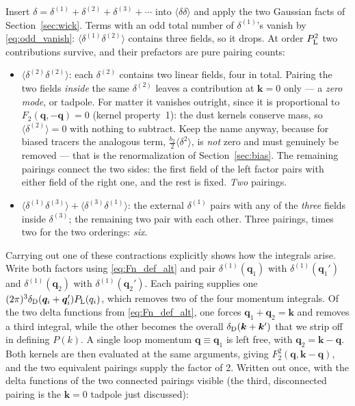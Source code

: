 \documentclass[a4paper,11pt]{article}
\newcommand{\vq}{\bm{q}}
\newcommand{\vk}{\bm{k}}
\def\Plin{P_{\rm L}}
\def\dirac{\delta_{\rm D}}
\numberwithin{equation}{section}
\begin{document}
Insert $\delta = \delta^{(1)} + \delta^{(2)} + \delta^{(3)} + \cdots$ into $\langle\delta\delta\rangle$ and apply the two Gaussian facts of Section~\ref{sec:wick}. Terms with an odd total number of $\delta^{(1)}$'s vanish by \eqref{eq:odd_vanish}: $\langle\delta^{(1)}\delta^{(2)}\rangle$ contains three fields, so it drops. At order $\Plin^2$ two contributions survive, and their prefactors are pure pairing counts:
\begin{itemize}[itemsep=2pt,topsep=2pt]
\item $\langle\delta^{(2)}\delta^{(2)}\rangle$: each $\delta^{(2)}$ contains two linear fields, four in total. Pairing the two fields \emph{inside} the same $\delta^{(2)}$ leaves a contribution at $\vk=0$ only --- a \emph{zero mode}, or tadpole. For matter it vanishes outright, since it is proportional to $F_2(\vq,-\vq) = 0$ (kernel property~1): the dust kernels conserve mass, so $\langle\delta^{(2)}\rangle = 0$ with nothing to subtract. Keep the name anyway, because for biased tracers the analogous term, $\tfrac{b_2}{2}\langle\delta^2\rangle$, is \emph{not} zero and must genuinely be removed --- that is the renormalization of Section~\ref{sec:bias}. The remaining pairings connect the two sides: the first field of the left factor pairs with either field of the right one, and the rest is fixed. \emph{Two} pairings.
\item $\langle\delta^{(1)}\delta^{(3)}\rangle + \langle\delta^{(3)}\delta^{(1)}\rangle$: the external $\delta^{(1)}$ pairs with any of the \emph{three} fields inside $\delta^{(3)}$; the remaining two pair with each other. Three pairings, times two for the two orderings: \emph{six}.
\end{itemize}
Carrying out one of these contractions explicitly shows how the integrals arise. Write both factors using \eqref{eq:Fn_def_alt} and pair $\delta^{(1)}(\vq_1)$ with $\delta^{(1)}(\vq_1')$ and $\delta^{(1)}(\vq_2)$ with $\delta^{(1)}(\vq_2')$. Each pairing supplies one $(2\pi)^3\dirac(\vq_i+\vq_i')\Plin(q_i)$, which removes two of the four momentum integrals. Of the two delta functions from \eqref{eq:Fn_def_alt}, one forces $\vq_1 + \vq_2 = \vk$ and removes a third integral, while the other becomes the overall $\dirac(\vk+\vk')$ that we strip off in defining $P(k)$. A single loop momentum $\vq \equiv \vq_1$ is left free, with $\vq_2 = \vk - \vq$. Both kernels are then evaluated at the same arguments, giving $F_2^2(\vq,\vk-\vq)$, and the two equivalent pairings supply the factor of 2. Written out once, with the delta functions of the two connected pairings visible (the third, disconnected pairing is the $\vk=0$ tadpole just discussed):
\end{document}
